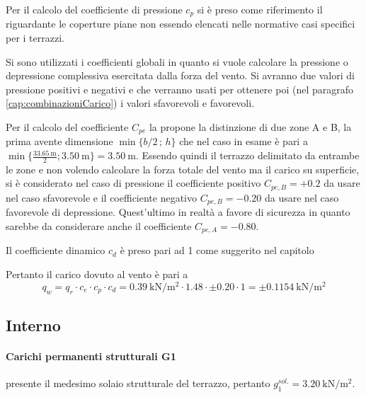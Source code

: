 Per il calcolo del coefficiente di pressione $c_p$ si è preso come riferimento il  riguardante le coperture piane non essendo elencati nelle normative casi specifici per i terrazzi.

Si sono utilizzati i coefficienti globali in quanto si vuole calcolare la pressione o depressione complessiva esercitata dalla forza del vento. 
Si avranno due valori di pressione positivi e negativi e che verranno usati per ottenere poi (nel paragrafo \ref{cap:combinazioniCarico}) i valori sfavorevoli e favorevoli.

Per il calcolo del coefficiente $C_{pe}$ la  propone la distinzione di due zone A e B, la prima avente dimensione $\min\{ b/2\,;\,h\}$ che nel caso in esame è pari a $\min\{\frac{\SI{33.65}{\meter}}{2};\SI{3.50}{\meter}\}=\SI{3.50}{\meter}$.
Essendo quindi il terrazzo delimitato da entrambe le zone e non volendo calcolare la forza totale del vento ma il carico su superficie, si è considerato nel caso di pressione il coefficiente positivo $C_{pe,B}=+0.2$ da usare nel caso sfavorevole e il coefficiente negativo $C_{pe,B}=-0.20$ da usare nel caso favorevole di depressione.
Quest'ultimo in realtà a favore di sicurezza in quanto sarebbe da considerare anche il coefficiente $C_{pe,A}=-0.80$.

Il coefficiente dinamico $c_d$ è preso pari ad 1 come suggerito nel capitolo 

Pertanto il carico dovuto al vento è pari a 
\[
	q_w = q_r \cdot c_e \cdot c_p \cdot c_d = \SI{0.39}{\kilo\newton\per\square\meter}\cdot 1.48 \cdot \pm 0.20 \cdot 1= \pm \SI{0.1154}{\kilo\newton\per\square\meter}
\]
\subsection{Interno}
\paragraph*{Carichi permanenti strutturali G1}
\e presente il medesimo solaio strutturale del terrazzo, pertanto $g_1^{sol.}=\SI{3.20}{\kilo\newton\per\square\meter}$.
